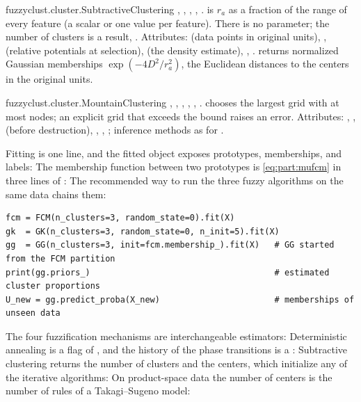 \begin{apibox}{fuzzyclust.cluster.SubtractiveClustering}
, , , , .  is $r_a$ as a fraction of the range of every feature (a scalar or one value per feature). There is no  parameter; the number of clusters is a result, . Attributes:  (data points in original units), ,  (relative potentials at selection),  (the density estimate), , .  returns normalized Gaussian memberships $\exp(-4D^2/r_a^2)$,  the Euclidean distances to the centers in the original units.
\end{apibox}

\begin{apibox}{fuzzyclust.cluster.MountainClustering}
, , , , , .  chooses the largest grid with at most  nodes; an explicit grid that exceeds the bound raises an error. Attributes: , ,  (before destruction), , , ; inference methods as for .
\end{apibox}

Fitting is one line, and the fitted object exposes prototypes, memberships, and labels:
The membership function between two prototypes is \eqref{eq:part:mufcm} in three lines of :
The recommended way to run the three fuzzy algorithms on the same data chains them:
\begin{lstlisting}
fcm = FCM(n_clusters=3, random_state=0).fit(X)
gk  = GK(n_clusters=3, random_state=0, n_init=5).fit(X)
gg  = GG(n_clusters=3, init=fcm.membership_).fit(X)   # GG started from the FCM partition
print(gg.priors_)                                     # estimated cluster proportions
U_new = gg.predict_proba(X_new)                       # memberships of unseen data
\end{lstlisting}
The four fuzzification mechanisms are interchangeable estimators:
Deterministic annealing is a flag of , and the history of the phase transitions is a :
Subtractive clustering returns the number of clusters and the centers, which initialize any of the iterative algorithms:
On product-space data the number of centers is the number of rules of a Takagi--Sugeno model:

